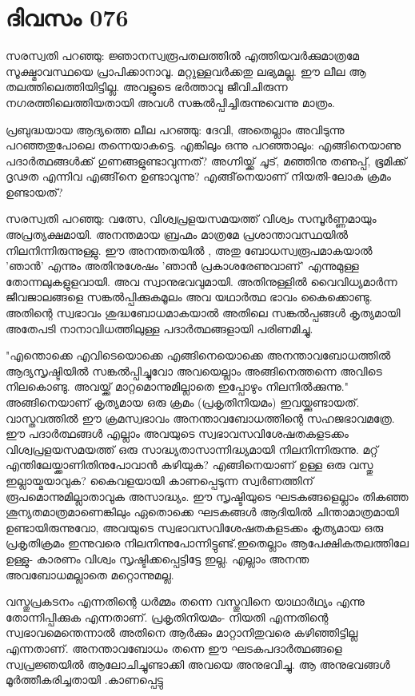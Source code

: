 \newpage
\section{ദിവസം 076}


സരസ്വതി പറഞ്ഞു: ജ്ഞാനസ്വരൂപതലത്തില്‍ എത്തിയവര്‍ക്കുമാത്രമേ സൂക്ഷ്മാവസ്ഥയെ
 പ്രാപിക്കാനാവൂ. മറ്റുള്ളവര്‍ക്കതു ലഭ്യമല്ല. ഈ ലീല ആ തലത്തിലെത്തിയിട്ടില്ല. അവളുടെ ഭര്‍ത്താവു ജീവിചിരുന്ന നഗരത്തിലെത്തിയതായി അവള്‍ സങ്കല്‍പ്പിച്ചിരുന്നുവെന്നു മാത്രം.

പ്രബുദ്ധയായ ആദ്യത്തെ ലീല പറഞ്ഞു: ദേവി, അതെല്ലാം അവിടുന്നു പറഞ്ഞതുപോലെ തന്നെയാകട്ടെ. എങ്കിലും ഒന്നു പറഞ്ഞാലും: എങ്ങിനെയാണു പദാര്‍ത്ഥങ്ങള്‍ക്ക്‌ ഗുണങ്ങളുണ്ടാവുന്നത്‌? അഗ്നിയ്ക്ക്‌ ചൂട്‌, മഞ്ഞിനു തണുപ്പ്‌, ഭൂമിക്ക്‌ ദൃഢത എന്നിവ എങ്ങി്‌നെ ഉണ്ടാവുന്നു? എങ്ങി്‌നെയാണ്‌ നിയതി-ലോക ക്രമം ഉണ്ടായത്‌?

സരസ്വതി പറഞ്ഞു: വത്സേ, വിശ്വപ്രളയസമയത്ത്‌ വിശ്വം സമ്പൂര്‍ണ്ണമായും അപ്രത്യക്ഷമായി. അനന്തമായ ബ്രഹ്മം മാത്രമേ പ്രശാന്താവസ്ഥയില്‍ നിലനിന്നിരുന്നുള്ളു. ഈ അനന്തതയില്‍ , അതു ബോധസ്വരൂപമാകയാല്‍ 'ഞാന്‍' എന്നും അതിനുശേഷം 'ഞാന്‍ പ്രകാശരേണുവാണ്‌' എന്നുമുള്ള തോന്നലുകളുളവായി. അവ സ്വാനുഭവവുമായി. അതിനുള്ളില്‍ വൈവിധ്യമാര്‍ന്ന ജീവജാലങ്ങളെ സങ്കല്‍പ്പിക്കുകമൂലം അവ യഥാര്‍ത്ഥ ഭാവം കൈക്കൊണ്ടു. അതിന്റെ സ്വഭാവം ശുദ്ധബോധമാകയാല്‍ അതിലെ സങ്കല്‍പ്പങ്ങള്‍ കൃത്യമായി അതേപടി നാനാവിധത്തിലുള്ള പദാര്‍ത്ഥങ്ങളായി പരിണമിച്ചു.

"എന്തൊക്കെ എവിടെയൊക്കെ എങ്ങിനെയൊക്കെ അനന്താവബോധത്തില്‍ ആദ്യസൃഷ്ടിയില്‍ സങ്കല്‍പ്പിച്ചുവോ അവയെല്ലാം അങ്ങിനെത്തന്നെ അവിടെ നിലകൊണ്ടു. അവയ്ക്ക്‌ മാറ്റമൊന്നുമില്ലാതെ ഇപ്പോഴും നിലനില്‍ക്കുന്നു." അങ്ങിനെയാണ്‌ കൃത്യമായ ഒരു ക്രമം (പ്രകൃതിനിയമം) ഇവയ്ക്കുണ്ടായത്‌. വാസ്തവത്തില്‍ ഈ ക്രമസ്വഭാവം അനന്താവബോധത്തിന്റെ സഹജഭാവമത്രേ. ഈ പദാര്‍ത്ഥങ്ങള്‍ എല്ലാം അവയുടെ സ്വഭാവസവിശേഷതകളടക്കം വിശ്വപ്രളയസമയത്ത്‌ ഒരു സാദ്ധ്യതാസാന്നിദ്ധ്യമായി നിലനിന്നിരുന്നു. മറ്റ്‌ എന്തിലേയ്ക്കാണിതിനുപോവാന്‍ കഴിയുക? എങ്ങിനെയാണ്‌ ഉള്ള ഒരു വസ്തു ഇല്ലായ്മയാവുക? കൈവളയായി കാണപ്പെടുന്ന സ്വര്‍ണത്തിന്‌ രൂപമൊന്നുമില്ലാതാവുക അസാദ്ധ്യം. ഈ സൃഷ്ടിയുടെ ഘടകങ്ങളെല്ലാം തികഞ്ഞ ശൂന്യതമാത്രമാണെങ്കിലും ഏതൊക്കെ ഘടകങ്ങള്‍ ആദിയില്‍ ചിന്താമാത്രമായി ഉണ്ടായിരുന്നുവോ, അവയുടെ സ്വഭാവസവിശേഷതകളടക്കം കൃത്യമായ ഒരു പ്രകൃതിക്രമം ഇന്നുവരെ നിലനിന്നുപോന്നിട്ടുണ്ട്‌.ഇതെല്ലാം ആപേക്ഷികതലത്തിലേ ഉള്ളു- കാരണം വിശ്വം സൃഷ്ടിക്കപ്പെട്ടിട്ടേ ഇല്ല. എല്ലാം അനന്ത അവബോധമല്ലാതെ മറ്റൊന്നുമല്ല.

വസ്തുപ്രകടനം എന്നതിന്റെ ധര്‍മ്മം തന്നെ വസ്തുവിനെ യാഥാര്‍ഥ്യം എന്നു തോന്നിപ്പിക്കുക എന്നതാണ്‌. പ്രകൃതിനിയമം- നിയതി എന്നതിന്റെ സ്വഭാവമെന്തെന്നാല്‍ അതിനെ ആര്‍ക്കും മാറ്റാനിതുവരെ കഴിഞ്ഞിട്ടില്ല എന്നതാണ്‌. അനന്താവബോധം തന്നെ ഈ ഘടകപദാര്‍ത്ഥങ്ങളെ സ്വപ്രജ്ഞയില്‍ ആലോചിച്ചുണ്ടാക്കി അവയെ അനുഭവിച്ചു. ആ അനുഭവങ്ങള്‍ മൂര്‍ത്തീകരിച്ചതായി .കാണപ്പെട്ടു

